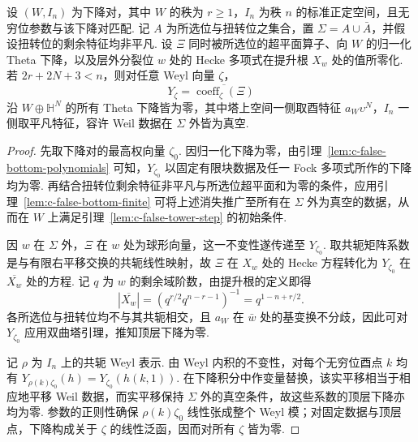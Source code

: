 \begin{lemma}[伪提升的下降沿双曲平面塔消失]
\label{lem:c-false-hyperbolic-tower}
\emitthmsource
设 $(W,I_n)$ 为下降对，其中 $W$ 的秩为 $r\ge1$，$I_n$ 为秩 $n$ 的标准正定空间，且无穷位参数与该下降对匹配. 记 $A$ 为所选位与扭转位之集合，置 $\Sigma=A\cup\bar A$，并假设扭转位的剩余特征均非平凡. 设 $\Xi$ 同时被所选位的超平面算子、向 $W$ 的归一化 Theta 下降，以及层外分裂位 $w$ 处的 Hecke 多项式在提升根 $X_w$ 处的值所零化. 若 $2r+2N+3<n$，则对任意 Weyl 向量 $\zeta$，
\[
     Y_\zeta=\overline{\operatorname{coeff}_\zeta(\Xi)}
\]
沿 $W\oplus\mathbb H^N$ 的所有 Theta 下降皆为零，其中塔上空间一侧取酉特征 $a_W\upsilon^N$，$I_n$ 一侧取平凡特征，容许 Weil 数据在 $\Sigma$ 外皆为真空.
\end{lemma}

\begin{proof}
先取下降对的最高权向量 $\zeta_0$. 因归一化下降为零，由引理~\ref{lem:c-false-bottom-polynomials} 可知，$Y_{\zeta_0}$ 以固定有限块数据及任一 Fock 多项式所作的下降均为零. 再结合扭转位剩余特征非平凡与所选位超平面和为零的条件，应用引理~\ref{lem:c-false-bottom-finite} 可将上述消失推广至所有在 $\Sigma$ 外为真空的数据，从而在 $W$ 上满足引理~\ref{lem:c-false-tower-step} 的初始条件.

因 $w$ 在 $\Sigma$ 外，$\Xi$ 在 $w$ 处为球形向量，这一不变性遂传递至 $Y_{\zeta_0}$. 取共轭矩阵系数是与有限右平移交换的共轭线性映射，故 $\Xi$ 在 $X_w$ 处的 Hecke 方程转化为 $Y_{\zeta_0}$ 在 $\overline{X_w}$ 处的方程. 记 $q$ 为 $w$ 的剩余域阶数，由提升根的定义即得
\[
       |\overline{X_w}|=(q^{r/2}q^{n-r-1})^{-1}
                         =q^{1-n+r/2}.
\]
各所选位与扭转位均不与其共轭相交，且 $a_W$ 在 $\bar w$ 处的基变换不分歧，因此可对 $Y_{\zeta_0}$ 应用双曲塔引理，推知顶层下降为零.

记 $\rho$ 为 $I_n$ 上的共轭 Weyl 表示. 由 Weyl 内积的不变性，对每个无穷位酉点 $k$ 均有 $Y_{\rho(k)\zeta_0}(h)=Y_{\zeta_0}(h(k,1))$. 在下降积分中作变量替换，该实平移相当于相应地平移 Weil 数据，而实平移保持 $\Sigma$ 外的真空条件，故这些系数的顶层下降亦均为零. 参数的正则性确保 $\rho(k)\zeta_0$ 线性张成整个 Weyl 模；对固定数据与顶层点，下降构成关于 $\zeta$ 的线性泛函，因而对所有 $\zeta$ 皆为零.
\end{proof}

